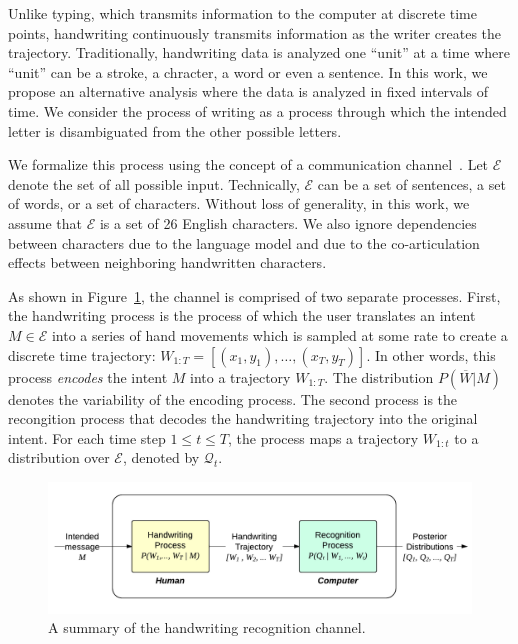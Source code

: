 \documentclass{sigchi}
\begin{document}
Unlike typing, which transmits information to the computer at discrete
time points, handwriting continuously transmits information as the
writer creates the trajectory. Traditionally, handwriting data is
analyzed one ``unit'' at a time where ``unit'' can be a stroke, a
chracter, a word or even a sentence. In this work, we propose an
alternative analysis where the data is analyzed in fixed intervals of
time. We consider the process of writing as a process through which
the intended letter is disambiguated from the other possible letters.

\newcommand{\intent}{M}
\newcommand{\intentSet}{\mathcal{E}}
\newcommand{\intentDist}{\mathcal{M}}
\newcommand{\pred}[1]{\mathcal{Q}_{#1}}
\newcommand{\predFinal}{\pred{\mathrm{final}}}
\newcommand{\writing}[1]{W_{1:{#1}}}
\newcommand{\writingVec}{\overline{W}}
\newcommand{\writingDist}{P(\writingVec | \intent)}
\newcommand{\tFinal}{T}
\newcommand{\expectedDuration}{\mathbb{E} \left[\tFinal\right]}
\newcommand{\condEntropy}{H(\predFinal | \intent)}

We formalize this process using the concept of a communication
channel~\cite{Shannon1948}.  Let $\intentSet$ denote the set of all
possible input. Technically, $\intentSet$ can be a set of sentences, a
set of words, or a set of characters. Without loss of generality, in
this work, we assume that $\intentSet$ is a set of 26 English
characters. We also ignore dependencies between characters due to
the language model and due to the co-articulation effects between
neighboring handwritten characters.

As shown in Figure~\ref{fig:hwr_channel}, the channel is comprised of
two separate processes. First, the handwriting process is the process
of which the user translates an intent $\intent \in \intentSet$ into a
series of hand movements which is sampled at some rate to create a
discrete time trajectory: $\writing{T} = \left[ (x_1,y_1), \ldots,
  (x_T,y_T) \right]$. In other words, this process {\em encodes} the
intent $\intent$ into a trajectory $\writing{T}$. The distribution
$\writingDist$ denotes the variability of the encoding process. The
second process is the recongition process that decodes the handwriting
trajectory into the original intent. For each time step $1 \le t \le
T$, the process maps a trajectory $\writing{t}$ to a distribution over
$\intentSet$, denoted by $\pred{t}$.

\begin{figure}
  \centering
  \includegraphics[width=0.9\columnwidth]{figures/hwr_channel.pdf}
  \caption{A summary of the handwriting recognition channel.}
  \label{fig:hwr_channel}
\end{figure}
\end{document}
